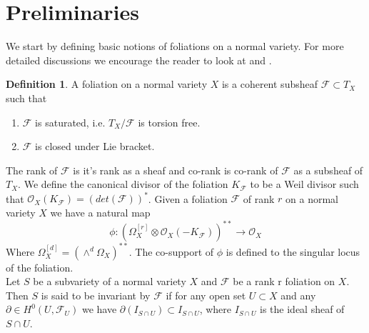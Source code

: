 \documentclass[12pt]{amsart}%
\theoremstyle{plain}
\theoremstyle{remark}
\theoremstyle{definition}
\newcommand{\<}{\leq}
\theoremstyle{definition}
\newtheorem{definition}[theorem]{Definition}
\theoremstyle{definition}
\numberwithin{equation}{section}
\theoremstyle{remark}
\begin{document}
\section{Preliminaries}
We start by defining basic notions of foliations on a normal variety. For more detailed discussions we encourage the reader to look at \cite{CS21} and \cite{CS20}.
\begin{definition}
    A foliation on a normal variety $X$ is a coherent subsheaf $\mathcal{F}\subset T_X$ such that
    \begin{enumerate}
        
    
    \item $\mathcal{F}$ is saturated, i.e. $T_X/\mathcal{F}$ is torsion free.
    \item $\mathcal{F}$ is closed under Lie bracket.
    \end{enumerate}
    The rank of $\mathcal{F}$ is it's rank as a sheaf and co-rank is co-rank of $\mathcal{F}$ as a subsheaf of $T_X$. We define the canonical divisor of the foliation $K_{\mathcal{F}}$ to be a Weil divisor such that $\mathcal{O}_X(K_{\mathcal{F}})=(det(\mathcal{F}))^*$. Given a foliation $\mathcal{F}$ of rank $r$ on a normal variety $X$ we have a natural map \[
    \phi: (\Omega^{[r]}_X\otimes \mathcal{O}_{X}(-K_{\mathcal{F}}))^{**}\rightarrow \mathcal{O}_X
    \]
    Where $\Omega^{[d]}_X=(\wedge^d \Omega_X)^{**}$. The co-support of $\phi$ is defined to the singular locus of the foliation.\\
    Let $S$ be a subvariety of a normal variety $X$ and $\mathcal{F}$ be a rank r foliation on $X$. Then $S$ is said to be invariant by $\mathcal{F}$ if for any open set $U\subset X$ and any $\partial\in H^0(U,\mathcal{F}_U)$ we have $\partial (I_{S\cap U})\subset I_{S\cap U}$, where $I_{S\cap U}$ is the ideal sheaf of $S\cap U$.
\end{definition}
\end{document}
